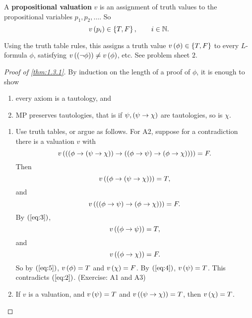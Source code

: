 \begin{definition}
A \textbf{propositional valuation} $ v $ is an assignment of truth values to the propositional variables $ p_1, p_2, \dots $. So
$$ v\left( p_i \right) \in \left\{ T, F \right\}, \qquad i \in \mathbb{N}. $$
\end{definition}

\begin{note*}
Using the truth table rules, this assigns a truth value $ v\left( \phi \right) \in \left\{ T, F \right\} $ to every $ L $-formula $ \phi $, satisfying $ v\left( \left( \neg \phi \right) \right) \ne v\left( \phi \right) $, etc. See problem sheet $ 2 $.
\end{note*}

\begin{proof}[Proof of \ref{thm:1.3.1}]
By induction on the length of a proof of $ \phi $, it is enough to show
\begin{enumerate}
\item every axiom is a tautology, and
\item MP preserves tautologies, that is if $ \psi, \left( \psi \rightarrow \chi \right) $ are tautologies, so is $ \chi $.
\end{enumerate}
\begin{enumerate}
\item Use truth tables, or argue as follows. For A2, suppose for a contradiction there is a valuation $ v $ with
$$ v\left( \left( \left( \phi \rightarrow \left( \psi \rightarrow \chi \right) \right) \rightarrow \left( \left( \phi \rightarrow \psi \right) \rightarrow \left( \phi \rightarrow \chi \right) \right) \right) \right) = F. $$
Then
\begin{equation}
\label{eq:2}
v\left( \left( \phi \rightarrow \left( \psi \rightarrow \chi \right) \right) \right) = T,
\end{equation}
and
\begin{equation}
\label{eq:3}
v\left( \left( \left( \phi \rightarrow \psi \right) \rightarrow \left( \phi \rightarrow \chi \right) \right) \right) = F.
\end{equation}
By $ \left( \ref{eq:3} \right) $,
\begin{equation}
\label{eq:4}
v\left( \left( \phi \rightarrow \psi \right) \right) = T,
\end{equation}
and
\begin{equation}
\label{eq:5}
v\left( \left( \phi \rightarrow \chi \right) \right) = F.
\end{equation}
So by $ \left( \ref{eq:5} \right) $, $ v\left( \phi \right) = T $ and $ v\left( \chi \right) = F $. By $ \left( \ref{eq:4} \right) $, $ v\left( \psi \right) = T $. This contradicts $ \left( \ref{eq:2} \right) $. (Exercise: A1 and A3)
\item If $ v $ is a valuation, and $ v\left( \psi \right) = T $ and $ v\left( \left( \psi \rightarrow \chi \right) \right) = T $, then $ v\left( \chi \right) = T $.
\end{enumerate}
\end{proof}

